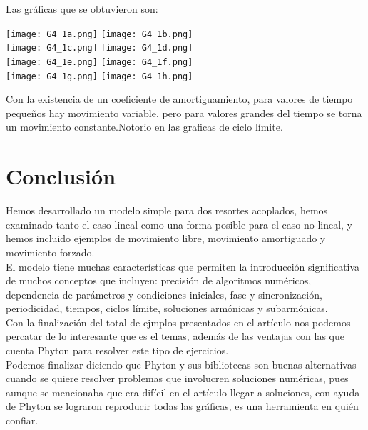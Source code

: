 \documentclass[12pt]{article}
\begin{document}
Las gráficas que se obtuvieron son:
\begin{center}
    \texttt{[image: G4\_1a.png]}\hspace*{\fill}
    \texttt{[image: G4\_1b.png]}\\
     \texttt{[image: G4\_1c.png]}\hspace*{\fill}
    \texttt{[image: G4\_1d.png]}\\
     \texttt{[image: G4\_1e.png]}\hspace*{\fill}
    \texttt{[image: G4\_1f.png]}\\
      \texttt{[image: G4\_1g.png]}\hspace*{\fill}
    \texttt{[image: G4\_1h.png]}\\
\end{center}
Con la existencia de un coeficiente de amortiguamiento, para valores de tiempo pequeños hay movimiento variable, pero para valores grandes del tiempo se torna un movimiento constante.Notorio en las graficas de ciclo límite.\\

\section*{Conclusión}

Hemos desarrollado un modelo simple para dos resortes acoplados, hemos examinado tanto el caso lineal como una forma posible para el caso no lineal, y hemos incluido ejemplos de movimiento libre, movimiento amortiguado y movimiento forzado.\\

El modelo tiene muchas características que permiten la introducción significativa de muchos conceptos que incluyen: precisión de algoritmos numéricos, dependencia de parámetros y condiciones iniciales, fase y sincronización, periodicidad, tiempos, ciclos límite, soluciones armónicas y subarmónicas. \\

Con la finalización del total de ejmplos presentados en el artículo nos podemos percatar de lo interesante que es el temas, además de las ventajas con las que cuenta Phyton para resolver este tipo de ejercicios.\\

Podemos finalizar diciendo que Phyton y sus bibliotecas son buenas alternativas cuando se quiere resolver problemas que involucren soluciones numéricas, pues aunque se mencionaba que era difícil en el artículo llegar a soluciones, con ayuda de Phyton se lograron reproducir todas las gráficas, es una herramienta en quién confiar. 
\newpage
\end{document}
